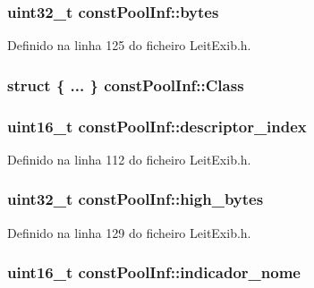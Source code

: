 \hypertarget{structconst_pool_inf_a6e7de138b8c2f5514813538787f73c16}{
\subsubsection[{bytes}]{\setlength{\rightskip}{0pt plus 5cm}uint32\-\_\-t const\-Pool\-Inf\-::bytes}}\label{structconst_pool_inf_a6e7de138b8c2f5514813538787f73c16}


Definido na linha 125 do ficheiro Leit\-Exib.\-h.

\hypertarget{structconst_pool_inf_adb4639fcbfae6547548f36dac46a1ce5}{
\subsubsection[{Class}]{\setlength{\rightskip}{0pt plus 5cm}struct \{ ... \}   const\-Pool\-Inf\-::\-Class}}\label{structconst_pool_inf_adb4639fcbfae6547548f36dac46a1ce5}
\hypertarget{structconst_pool_inf_a01d1f403e7ed5762b986ae2fe6e7db4b}{
\subsubsection[{descriptor\-\_\-index}]{\setlength{\rightskip}{0pt plus 5cm}uint16\-\_\-t const\-Pool\-Inf\-::descriptor\-\_\-index}}\label{structconst_pool_inf_a01d1f403e7ed5762b986ae2fe6e7db4b}


Definido na linha 112 do ficheiro Leit\-Exib.\-h.

\hypertarget{structconst_pool_inf_ab116ef79f6cae5784e038805c26f2d20}{
\subsubsection[{high\-\_\-bytes}]{\setlength{\rightskip}{0pt plus 5cm}uint32\-\_\-t const\-Pool\-Inf\-::high\-\_\-bytes}}\label{structconst_pool_inf_ab116ef79f6cae5784e038805c26f2d20}


Definido na linha 129 do ficheiro Leit\-Exib.\-h.

\hypertarget{structconst_pool_inf_a2f80c7393ff5829654d7418b7264110a}{
\subsubsection[{indicador\-\_\-nome}]{\setlength{\rightskip}{0pt plus 5cm}uint16\-\_\-t const\-Pool\-Inf\-::indicador\-\_\-nome}}\label{structconst_pool_inf_a2f80c7393ff5829654d7418b7264110a}


